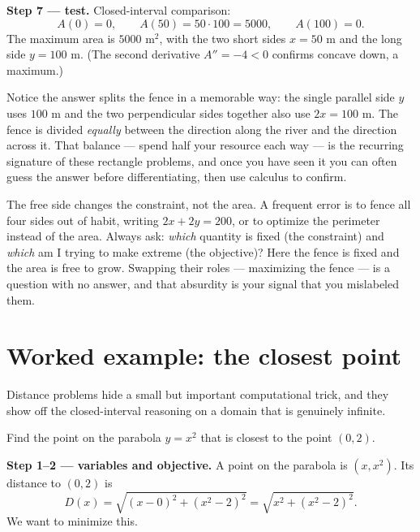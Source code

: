 \textbf{Step 7 --- test.} Closed-interval comparison:
\[
A(0)=0, \qquad A(50) = 50\cdot 100 = 5000, \qquad A(100)=0.
\]
The maximum area is $\boxed{5000\text{ m}^2}$, with the two short sides $x=50$ m and
the long side $y=100$ m. (The second derivative $A''=-4<0$ confirms concave down, a
maximum.)

\begin{intuitionbox}
Notice the answer splits the fence in a memorable way: the single parallel side $y$
uses $100$ m and the two perpendicular sides together also use $2x=100$ m. The fence
is divided \emph{equally} between the direction along the river and the direction
across it. That balance --- spend half your resource each way --- is the recurring
signature of these rectangle problems, and once you have seen it you can often guess
the answer before differentiating, then use calculus to confirm.
\end{intuitionbox}

\begin{trapbox}
The free side changes the constraint, not the area. A frequent error is to fence all
four sides out of habit, writing $2x+2y=200$, or to optimize the perimeter instead of
the area. Always ask: \emph{which} quantity is fixed (the constraint) and \emph{which}
am I trying to make extreme (the objective)? Here the fence is fixed and the area is
free to grow. Swapping their roles --- maximizing the fence --- is a question with no
answer, and that absurdity is your signal that you mislabeled them.
\end{trapbox}

\section{Worked example: the closest point}

Distance problems hide a small but important computational trick, and they show off
the closed-interval reasoning on a domain that is genuinely infinite.

\begin{example}\label{ch17:ex-distance}
Find the point on the parabola $y = x^2$ that is closest to the point $(0, 2)$.
\end{example}

\textbf{Step 1--2 --- variables and objective.} A point on the parabola is
$(x, x^2)$. Its distance to $(0,2)$ is
\[
D(x) = \sqrt{(x-0)^2 + (x^2 - 2)^2} = \sqrt{x^2 + (x^2-2)^2}.
\]
We want to minimize this.

